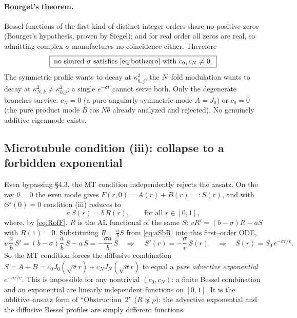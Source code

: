 \documentclass{article}
\begin{document}
\paragraph{Bourget's theorem.} Bessel functions of the first kind of distinct
integer orders share no positive zeros (Bourget's hypothesis, proven by Siegel);
and for real order all zeros are real, so admitting complex $\sigma$ manufactures
no coincidence either. Therefore
\begin{equation}
\boxed{\;\text{no shared }\sigma\text{ satisfies }\eqref{eq:bothzero}
\text{ with }c_0,c_N\neq0.\;}
\end{equation}
The symmetric profile wants to decay at $\kappa_{0,j}^2$; the $N$--fold
modulation wants to decay at $\kappa_{N,k}^2\neq\kappa_{0,j}^2$; a single
$e^{-\sigma t}$ cannot serve both. Only the degenerate branches survive:
$c_N=0$ (a pure angularly symmetric mode $A=J_0$) or $c_0=0$ (the pure product
mode $B\cos N\theta$ already analyzed and rejected). No genuinely additive
eigenmode exists.

\subsection{Microtubule condition (iii): collapse to a forbidden exponential}

Even bypassing \S4.3, the MT condition independently rejects the ansatz. On the
ray $\theta=0$ the even mode gives $F(r,0)=A(r)+B(r)=:S(r)$, and with
$\Theta'(0)=0$ condition (iii) reduces to
\begin{equation}
a\,S(r)=b\,R(r),\qquad\text{for all }r\in[0,1],
\label{eq:aSbR}
\end{equation}
where, by \eqref{eq:RofF}, $R$ is the AL functional of the same $S$:
$vR'=(b-\sigma)R-aS$ with $R(1)=0$. Substituting $R=\tfrac{a}{b}S$ from
\eqref{eq:aSbR} into this first--order ODE,
\begin{equation}
v\,\frac{a}{b}\,S'=(b-\sigma)\frac{a}{b}\,S-a\,S
=-\frac{\sigma a}{b}\,S
\quad\Longrightarrow\quad
\boxed{\,S'(r)=-\frac{\sigma}{v}\,S(r)\,}
\quad\Longrightarrow\quad
S(r)=S_0\,e^{-\sigma r/v}.
\label{eq:Sexp}
\end{equation}
So the MT condition forces the diffusive combination
$S=A+B=c_0J_0(\sqrt\sigma r)+c_NJ_N(\sqrt\sigma r)$ to equal a \emph{pure
advective exponential} $e^{-\sigma r/v}$. This is impossible for any nontrivial
$(c_0,c_N)$: a finite Bessel combination and an exponential are linearly
independent functions on $[0,1]$. It is the additive--ansatz form of
``Obstruction~2'' ($R\not\propto\rho$): the advective exponential and the
diffusive Bessel profiles are simply different functions.
\end{document}
